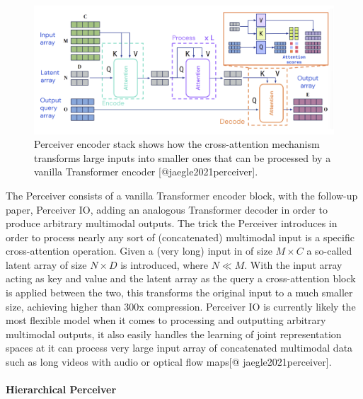 \documentclass[
]{krantz}
\begin{document}
\begin{figure}

{\centering \includegraphics[width=1\linewidth]{figures/03-01/perceiver-io} 

}

\caption{Perceiver encoder stack shows how the cross-attention mechanism transforms large inputs into smaller ones that can be processed by a vanilla Transformer encoder [@jaegle2021perceiver].}\label{fig:perceiver-io}
\end{figure}

The Perceiver consists of a vanilla Transformer encoder block, with the follow-up paper, Perceiver IO, adding an analogous Transformer decoder in order to produce arbitrary multimodal outputs. The trick the Perceiver introduces in order to process nearly any sort of (concatenated) multimodal input is a specific cross-attention operation. Given a (very long) input in of size \(M \times C\) a so-called latent array of size \(N\times D\) is introduced, where \(N\ll M\). With the input array acting as key and value and the latent array as the query a cross-attention block is applied between the two, this transforms the original input to a much smaller size, achieving higher than 300x compression. Perceiver IO is currently likely the most flexible model when it comes to processing and outputting arbitrary multimodal outputs, it also easily handles the learning of joint representation spaces at it can process very large input array of concatenated multimodal data such as long videos with audio or optical flow maps\citep{DBLP:conf/icml/JaegleGBVZC21}{[}@ jaegle2021perceiver{]}.

\hypertarget{hierarchical-perceiver}{%
\paragraph{Hierarchical Perceiver}\label{hierarchical-perceiver}}
\end{document}
